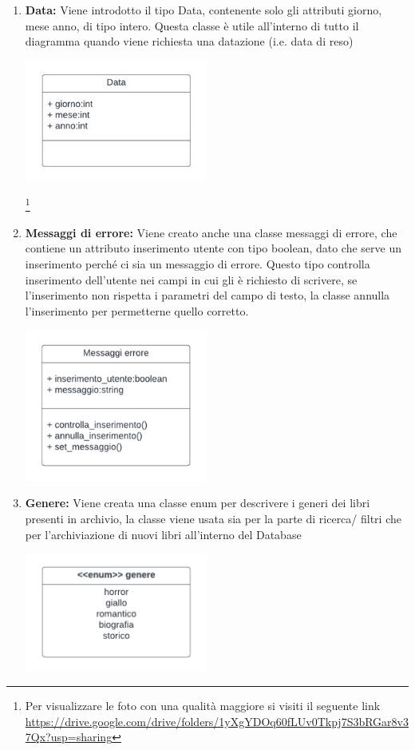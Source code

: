 \documentclass{article}
\begin{document}
\begin{enumerate}
    \item \textbf{Data:} Viene introdotto il tipo Data, contenente solo gli attributi giorno, mese anno, di tipo intero. Questa classe è utile all’interno di tutto il diagramma quando viene richiesta una datazione (i.e. data di reso)
    \begin{center}
        \includegraphics[width=60mm]{D3/Images/Data.jpg}
    \end{center}

\footnote{Per visualizzare le foto con una qualità maggiore si visiti il seguente link \url{https://drive.google.com/drive/folders/1yXgYDOq60fLUv0Tkpj7S3bRGar8v37Qx?usp=sharing}}

    \item \textbf{Messaggi di errore:} Viene creato anche una classe messaggi di errore, che contiene un attributo inserimento utente con tipo boolean, dato che serve un inserimento perché ci sia un messaggio di errore. Questo tipo controlla inserimento dell’utente nei campi in cui gli è richiesto di scrivere, se l’inserimento non rispetta i parametri del campo di testo, la classe annulla l'inserimento per permetterne quello corretto.
    \begin{center}
        \includegraphics[width=60mm]{D3/Images/MessaggiErrore.jpg}
    \end{center}

    \item \textbf{Genere:} Viene creata una classe enum per descrivere i generi dei libri presenti in archivio, la  classe viene usata sia per la parte di ricerca/ filtri che per l’archiviazione di nuovi libri all’interno del Database
    \begin{center}
        \includegraphics[width=60mm]{D3/Images/genere.png}
    \end{center}


\end{enumerate}
\end{document}
